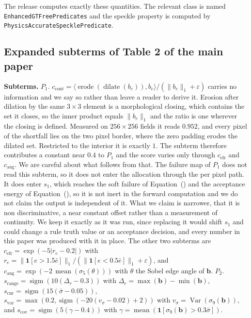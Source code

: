 \noindent The release computes exactly these quantities. The relevant class is named
\texttt{EnhancedGTFreePredicates} and the speckle property is computed by
\texttt{PhysicsAccurateSpecklePredicate}.

\subsection{Expanded subterms of Table 2 of the main paper}
{\footnotesize
\textbf{Subterms.}
$P_1$.
$c_{\text{cont}}=\langle\operatorname{erode}(\operatorname{dilate}(b_e)),b_e\rangle/(\|b_e\|_1+\varepsilon)$
carries no information and we say so rather than leave a reader to derive it. Erosion after dilation
by the same $3\times3$ element is a morphological closing, which contains the set it closes, so the
inner product equals $\|b_e\|_1$ and the ratio is one wherever the closing is defined. Measured on
$256\times256$ fields it reads $0.952$, and every pixel of the shortfall lies on the two pixel border,
where the zero padding erodes the dilated set. Restricted to the interior it is exactly $1$. The
subterm therefore contributes a constant near $0.4$ to $P_1$ and the score varies only through
$c_{\text{efr}}$ and $c_{\text{ang}}$. We are careful about what follows from that. The failure map
of $P_1$ does not read this subterm, so it does not enter the allocation through the per pixel path.
It does enter $s_1$, which reaches the soft failure of Equation~(\EqFailure) and the acceptance
energy of Equation~(\EqEnergy), so it is not inert in the forward computation and we do not claim the
output is independent of it. What we claim is narrower, that it is non discriminative, a near
constant offset rather than a measurement of continuity. We keep it exactly as it was run, since
replacing it would shift $s_1$ and could change a rule truth value or an acceptance decision, and
every number in this paper was produced with it in place. The other two subterms are
$c_{\text{efr}}=\exp(-5|r_e-0.2|)$ with
$r_e=\|\mathbf{1}[e>1.5\bar e]\|_1/(\|\mathbf{1}[e<0.5\bar e]\|_1+\varepsilon)$,
and $c_{\text{ang}}=\exp(-2\,\operatorname{mean}(\sigma_5(\theta)))$ with $\theta$ the Sobel edge angle of $\mathbf{b}$.
$P_2$.
$s_{\text{range}}=\operatorname{sigm}(10(\Delta_r-0.3))$ with $\Delta_r=\max(\mathbf{b})-\min(\mathbf{b})$,
$s_{\text{cnr}}=\operatorname{sigm}(15(\bar\sigma-0.05))$,
$s_{\text{var}}=\max(0.2,\operatorname{sigm}(-20(v_\sigma-0.02)+2))$ with $v_\sigma=\operatorname{Var}(\sigma_9(\mathbf{b}))$,
and $s_{\text{cov}}=\operatorname{sigm}(5(\gamma-0.4))$ with $\gamma=\operatorname{mean}(\mathbf{1}[\sigma_9(\mathbf{b})>0.3\bar\sigma])$.
}
